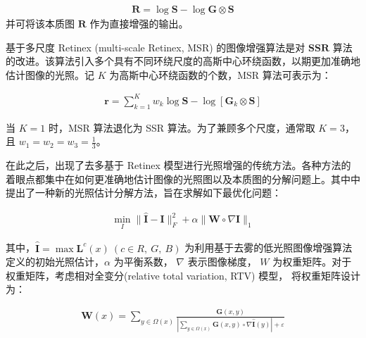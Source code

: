 \documentclass[letterpaper,10pt]{article}
\begin{document}
		\begin{equation}
			\begin{aligned}
				\mathbf{R} = \log \mathbf{S} - \log \mathbf{G} \otimes \mathbf{S}
			\end{aligned}
			\label{eq: R}
		\end{equation}
		并可将该本质图 $\mathbf{R}$ 作为直接增强的输出。
		
		基于多尺度 Retinex (multi-scale Retinex, MSR) 的图像增强算法是对 $\mathbf{SSR}$ 算法的改进。该算法引入多个具有不同环绕尺度的高斯中心环绕函数，以期更加准确地估计图像的光照。记 $K$ 为高斯中心环绕函数的个数，MSR 算法可表示为：
		
		\begin{equation}
			\begin{aligned}
				\mathbf{r} = \sum_{k=1}^K w_k {\log \mathbf{S} - \log [\mathbf{G}_k \otimes \mathbf{S}] }
			\end{aligned}
			\label{eq: MSR}
		\end{equation}
		
		当 $K=1$ 时，MSR 算法退化为 SSR 算法。为了兼顾多个尺度，通常取 $K=3$，且 $w_1=w_2=w_3=\frac{1}{3}$。
		
		在此之后，出现了去多基于 Retinex 模型进行光照增强的传统方法。各种方法的着眼点都集中在如何更准确地估计图像的光照图以及本质图的分解问题上。其中\cite{7782813}中提出了一种新的光照估计分解方法，旨在求解如下最优化问题：
		
		\begin{equation}
			\begin{aligned}
				\min_I \| \hat{\mathbf{I}} - \mathbf{I} \|_F^2 + \alpha \| \mathbf{W} \circ \nabla\mathbf{I} \|_1
			\end{aligned}
			\label{eq: Optimisation}
		\end{equation}
		
		其中，$\hat{\mathbf{I}} = \max \mathbf{L}^c (x) \ (c \in {R,\ G,\ B})$ 为利用基于去雾的低光照图像增强算法定义的初始光照估计，$\alpha$ 为平衡系数， $\nabla$ 表示图像梯度， $W$ 为权重矩阵。对于权重矩阵，考虑相对全变分(relative total variation, RTV) 模型， 将权重矩阵设计为：
		
		\begin{equation}
			\begin{aligned}
				\mathbf{W}(x) = \sum_{y \in \Omega (x)} \frac{\mathbf{G}(x,y)}{\left|\sum_{y\in \Omega (x)} \mathbf{G}(x, y) \circ \nabla \hat{\mathbf{I}}(y) \right| + \varepsilon}
			\end{aligned}
			\label{eq: Weight}
		\end{equation}
		
\end{document}
